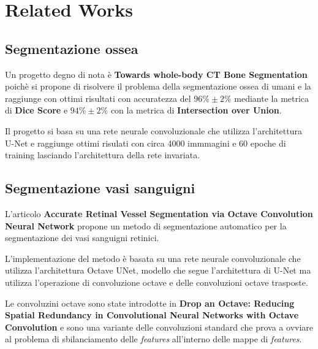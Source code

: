 \section{Related Works}
\subsection{Segmentazione ossea}


Un progetto degno di nota \`e \textbf{Towards whole-body CT Bone Segmentation} \cite{Klein_2018}
poich\`e si propone di risolvere il problema della segmentazione ossea di umani e la raggiunge con
ottimi risultati con accuratezza del $96\%\pm 2\%$ mediante la metrica di \textbf{Dice Score} e $94\%\pm 2\%$ con la metrica di \textbf{Intersection over Union}.


Il progetto si basa su una rete neurale convoluzionale che utilizza l'architettura U-Net \cite{ronneberger2015unet}
e raggiunge ottimi risulati con circa 4000 immmagini e 60 epoche di training lasciando
l'architettura della rete invariata.


\subsection{Segmentazione vasi sanguigni}
L'articolo \textbf{Accurate Retinal Vessel Segmentation via
Octave Convolution Neural Network} \cite{fan2019octave} propone un metodo di segmentazione automatico per la segmentazione dei vasi sanguigni retinici.

L'implementazione del metodo \`e basata su una rete neurale convoluzionale che utilizza l'architettura Octave UNet, modello che segue l'architettura di U-Net \cite{ronneberger2015unet} ma utilizza l'operazione di convoluzione octave e delle convoluzioni octave trasposte.

Le convoluzini octave sono state introdotte in \textbf{Drop an Octave: Reducing Spatial Redundancy in Convolutional Neural Networks with Octave Convolution} \cite{chen2019drop} e sono una variante delle convoluzioni standard che prova a ovviare al problema di sbilanciamento delle \textit{features} all'interno delle mappe di \textit{features}.





